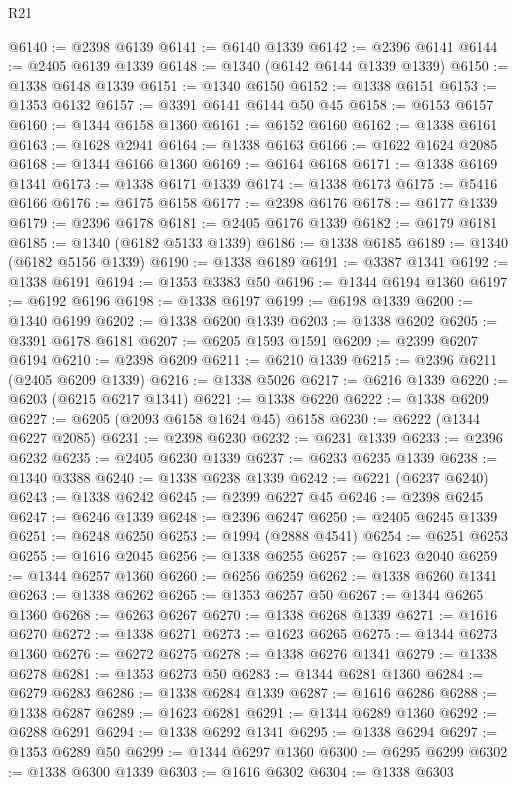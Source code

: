 \begin{lexlean}{R21}
\begin{coremodule}
@6140 := @2398 @6139
@6141 := @6140 @1339
@6142 := @2396 @6141
@6144 := @2405 @6139 @1339
@6148 := @1340 (@6142 @6144 @1339 @1339)
@6150 := @1338 @6148 @1339
@6151 := @1340 @6150
@6152 := @1338 @6151
@6153 := @1353 @6132
@6157 := @3391 @6141 @6144 @50 @45
@6158 := @6153 @6157
@6160 := @1344 @6158 @1360
@6161 := @6152 @6160
@6162 := @1338 @6161
@6163 := @1628 @2941
@6164 := @1338 @6163
@6166 := @1622 @1624 @2085
@6168 := @1344 @6166 @1360
@6169 := @6164 @6168
@6171 := @1338 @6169 @1341
@6173 := @1338 @6171 @1339
@6174 := @1338 @6173
@6175 := @5416 @6166
@6176 := @6175 @6158
@6177 := @2398 @6176
@6178 := @6177 @1339
@6179 := @2396 @6178
@6181 := @2405 @6176 @1339
@6182 := @6179 @6181
@6185 := @1340 (@6182 @5133 @1339)
@6186 := @1338 @6185
@6189 := @1340 (@6182 @5156 @1339)
@6190 := @1338 @6189
@6191 := @3387 @1341
@6192 := @1338 @6191
@6194 := @1353 @3383 @50
@6196 := @1344 @6194 @1360
@6197 := @6192 @6196
@6198 := @1338 @6197
@6199 := @6198 @1339
@6200 := @1340 @6199
@6202 := @1338 @6200 @1339
@6203 := @1338 @6202
@6205 := @3391 @6178 @6181
@6207 := @6205 @1593 @1591
@6209 := @2399 @6207 @6194
@6210 := @2398 @6209
@6211 := @6210 @1339
@6215 := @2396 @6211 (@2405 @6209 @1339)
@6216 := @1338 @5026
@6217 := @6216 @1339
@6220 := @6203 (@6215 @6217 @1341)
@6221 := @1338 @6220
@6222 := @1338 @6209
@6227 := @6205 (@2093 @6158 @1624 @45) @6158
@6230 := @6222 (@1344 @6227 @2085)
@6231 := @2398 @6230
@6232 := @6231 @1339
@6233 := @2396 @6232
@6235 := @2405 @6230 @1339
@6237 := @6233 @6235 @1339
@6238 := @1340 @3388
@6240 := @1338 @6238 @1339
@6242 := @6221 (@6237 @6240)
@6243 := @1338 @6242
@6245 := @2399 @6227 @45
@6246 := @2398 @6245
@6247 := @6246 @1339
@6248 := @2396 @6247
@6250 := @2405 @6245 @1339
@6251 := @6248 @6250
@6253 := @1994 (@2888 @4541)
@6254 := @6251 @6253
@6255 := @1616 @2045
@6256 := @1338 @6255
@6257 := @1623 @2040
@6259 := @1344 @6257 @1360
@6260 := @6256 @6259
@6262 := @1338 @6260 @1341
@6263 := @1338 @6262
@6265 := @1353 @6257 @50
@6267 := @1344 @6265 @1360
@6268 := @6263 @6267
@6270 := @1338 @6268 @1339
@6271 := @1616 @6270
@6272 := @1338 @6271
@6273 := @1623 @6265
@6275 := @1344 @6273 @1360
@6276 := @6272 @6275
@6278 := @1338 @6276 @1341
@6279 := @1338 @6278
@6281 := @1353 @6273 @50
@6283 := @1344 @6281 @1360
@6284 := @6279 @6283
@6286 := @1338 @6284 @1339
@6287 := @1616 @6286
@6288 := @1338 @6287
@6289 := @1623 @6281
@6291 := @1344 @6289 @1360
@6292 := @6288 @6291
@6294 := @1338 @6292 @1341
@6295 := @1338 @6294
@6297 := @1353 @6289 @50
@6299 := @1344 @6297 @1360
@6300 := @6295 @6299
@6302 := @1338 @6300 @1339
@6303 := @1616 @6302
@6304 := @1338 @6303

\end{coremodule}
\end{lexlean}
